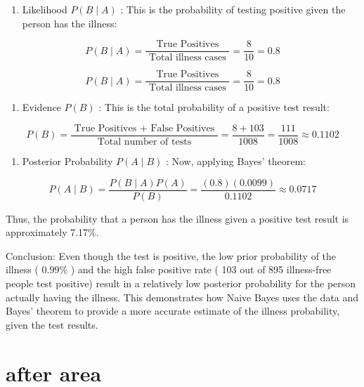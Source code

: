 \documentclass[
  12 pt,
  a4paper,
]{book}
\providecommand{\tightlist}{%
  \setlength{\itemsep}{0pt}\setlength{\parskip}{0pt}}
\numberwithin{equation}{section}
\theoremstyle{plain}      %
\theoremstyle{definition} %
\theoremstyle{remark}     %
\theoremstyle{note}         %
\begin{document}
\begin{enumerate}
\def\labelenumi{\arabic{enumi}.}
\setcounter{enumi}{1}
\tightlist
\item
  Likelihood \(P(B \mid A)\) : This is the probability of testing
  positive given the person has the illness:
\end{enumerate}

\[
P(B \mid A)=\frac{\text { True Positives }}{\text { Total illness cases }}=\frac{8}{10}=0.8
\]

\newpage

\[
P(B \mid A)=\frac{\text { True Positives }}{\text { Total illness cases }}=\frac{8}{10}=0.8
\]

\begin{enumerate}
\def\labelenumi{\arabic{enumi}.}
\setcounter{enumi}{2}
\tightlist
\item
  Evidence \(P(B)\) : This is the total probability of a positive test
  result:
\end{enumerate}

\[
P(B)=\frac{\text { True Positives + False Positives }}{\text { Total number of tests }}=\frac{8+103}{1008}=\frac{111}{1008} \approx 0.1102
\]

\begin{enumerate}
\def\labelenumi{\arabic{enumi}.}
\setcounter{enumi}{3}
\tightlist
\item
  Posterior Probability \(P(A \mid B)\) : Now, applying Bayes' theorem:
\end{enumerate}

\[
P(A \mid B)=\frac{P(B \mid A) P(A)}{P(B)}=\frac{(0.8)(0.0099)}{0.1102} \approx 0.0717
\]

Thus, the probability that a person has the illness given a positive
test result is approximately 7.17\%.

Conclusion: Even though the test is positive, the low prior probability
of the illness ( \(0.99 \%\) ) and the high false positive rate ( 103
out of 895 illness-free people test positive) result in a relatively low
posterior probability for the person actually having the illness. This
demonstrates how Naive Bayes uses the data and Bayes' theorem to provide
a more accurate estimate of the illness probability, given the test
results.

\newpage

\newpage

\hypertarget{after-area}{%
\section{after area}\label{after-area}}
\end{document}
